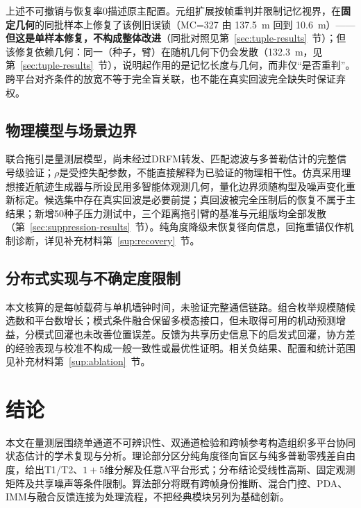 \documentclass[UTF8,a4paper,zihao=-4]{ctexart}
\begin{document}
上述不可撤销与恢复率0描述原主配置。元组扩展按帧重判并限制记忆视界，在\textbf{固定几何}的同批样本上修复了该例旧误锁（MC=327 由 137.5~m 回到 10.6~m）——\textbf{但这是单样本修复，不构成整体改进}（同批对照见第~\ref{sec:tuple-results}~节）；但该修复依赖几何：同一（种子，臂）在随机几何下仍会发散（132.3~m，见第~\ref{sec:tuple-results}~节），说明起作用的是记忆长度与几何，而非仅“是否重判”。跨平台对齐条件的放宽不等于完全盲关联，也不能在真实回波完全缺失时保证弃权。

\subsection{物理模型与场景边界}\label{sec:discussion-physical}
联合拖引是量测层模型，尚未经过DRFM转发、匹配滤波与多普勒估计的完整信号级验证；\(\rho\)是受控失配参数，不能直接解释为已验证的物理相干性。仿真采用理想接近航迹生成器与所设民用多智能体观测几何，量化边界须随构型及噪声变化重新标定。候选集中存在真实回波是必要前提；真回波被完全压制后的恢复不属于主结果；新增50种子压力测试中，三个距离拖引臂的基准与元组版均全部发散（第~\ref{sec:suppression-results}~节）。纯角度降级未恢复径向信息，回拖重锚仅作机制诊断，详见补充材料第~\ref{sup:recovery}~节。


\subsection{分布式实现与不确定度限制}\label{sec:discussion-distributed}
本文核算的是每帧载荷与单机墙钟时间，未验证完整通信链路。组合枚举规模随候选数和平台数增长；模式条件融合保留多模态接口，但未取得可用的机动预测增益，分模式回灌也未改善位置误差。反馈为共享历史信息下的启发式回灌，协方差的经验表现与校准不构成一般一致性或最优性证明。相关负结果、配置和统计范围见补充材料第~\ref{sup:ablation}~节。


\section{结论}\label{sec:conclusion}
本文在量测层围绕单通道不可辨识性、双通道检验和跨帧参考构造组织多平台协同状态估计的学术复现与分析。理论部分区分纯角度径向盲区与纯多普勒零残差自由度，给出T1/T2、\(1+5\)维分解及任意\(N\)平台形式；分布结论受线性高斯、固定观测矩阵及共享噪声等条件限制。算法部分将既有跨帧身份推断、混合门控、PDA、IMM与融合反馈连接为处理流程，不把经典模块另列为基础创新。
\end{document}

